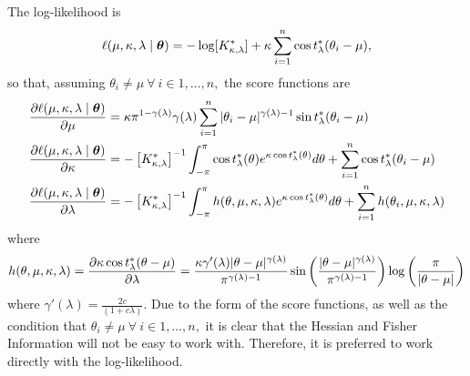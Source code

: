 The log-likelihood is
\begin{equation} \label{eqn:powbatll}
 \ell(\mu, \kappa, \lambda \mid \boldsymbol{\theta}) = -\log[K^\ast_{\kappa, \lambda}] + \kappa \sum_{i = 1}^n \cos t^\ast_\lambda(\theta_i - \mu),
\end{equation}
so that, assuming $\theta_i \neq \mu ~ \forall ~ i \in 1, \dots, n,$ the score functions are
\begin{align}
\frac{\partial  \ell(\mu, \kappa, \lambda \mid \boldsymbol{\theta})}{\partial \mu}     &=  \kappa \pi^{1 - \gamma(\lambda)} \gamma(\lambda) \sum_{i=1}^n  \vert \theta_i - \mu \vert^{\gamma(\lambda) - 1} \sin t^\ast_\lambda(\theta_i - \mu)\\
\frac{\partial  \ell(\mu, \kappa, \lambda \mid \boldsymbol{\theta})}{\partial \kappa}  &= - \left[K^\ast_{\kappa, \lambda}\right]^{-1}  \int_{-\pi}^\pi \cos t^\ast_\lambda(\theta) e^{\kappa \cos t^\ast_\lambda(\theta)} d\theta + \sum_{i=1}^n \cos t^\ast_\lambda(\theta_i - \mu)  \\
\frac{\partial  \ell(\mu, \kappa, \lambda \mid \boldsymbol{\theta})}{\partial \lambda} &= - \left[K^\ast_{\kappa, \lambda}\right]^{-1}  \int_{-\pi}^\pi h(\theta, \mu, \kappa, \lambda) e^{\kappa \cos t^\ast_\lambda(\theta)} d\theta  + \sum_{i=1}^n h(\theta_i, \mu, \kappa, \lambda)
\end{align}
where
\begin{equation}
h(\theta, \mu, \kappa, \lambda) = \frac{\partial \kappa \cos t^\ast_\lambda(\theta - \mu)}{\partial \lambda} =  \frac{ \kappa \gamma'(\lambda) \vert \theta - \mu \vert^{\gamma(\lambda)}}{\pi^{\gamma(\lambda) - 1}}  \sin \left( \frac{\vert \theta - \mu \vert^{\gamma(\lambda)}}{\pi^{\gamma(\lambda) - 1}} \right) \log\left(\frac{\pi}{\vert \theta - \mu \vert} \right)
\end{equation}
where \(\gamma'(\lambda) = \frac{2c}{(1 + c \lambda)}.\) Due to the form of the score functions, as well as the condition that $\theta_i \neq \mu ~ \forall ~ i \in 1, \dots, n,$ it is clear that the Hessian and Fisher Information will not be easy to work with. Therefore, it is preferred to work directly with the log-likelihood.
